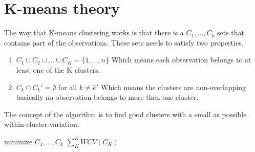 \section{K-means theory}
The way that K-means clustering works is that there is a $C_1,...,C_k$ sets that contains part of the observations. These sets needs to satisfy two properties.
\begin{enumerate}
	\item $ C_1 \cup C_2 \cup ... \cup C_K = \{ 1,...,n \}$ Which means each observation belongs to at least one of the K clusters.
	\item $ C_k \cap C_k' = \emptyset $ for all $k \neq k'$ Which means the clusters are non-overlapping basically no observation belongs to more then one cluster.
\end{enumerate}
The concept of the algorithm is to find good clusters with a small as possible within-cluster-variation.

minimize $C_1,...,C_k$ $ \sum_K^K WCV(C_K) $  